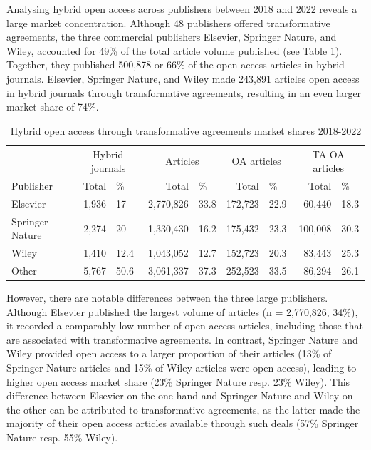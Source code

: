 \documentclass[a4paper,man,floatsintext,longtable,noextraspace,12pt]{apa6}
\begin{document}
Analysing hybrid open access across publishers between 2018 and 2022
reveals a large market concentration. Although 48 publishers offered
transformative agreements, the three commercial publishers Elsevier,
Springer Nature, and Wiley, accounted for 49\% of the total article
volume published (see Table \ref{tab:publisher_league_table}). Together,
they published 500,878 or 66\% of the open access articles in hybrid
journals. Elsevier, Springer Nature, and Wiley made 243,891 articles
open access in hybrid journals through transformative agreements,
resulting in an even larger market share of 74\%.

\begin{table}[H]

\caption{\label{tab:publisher_league_table}Hybrid open access through transformative agreements market shares 2018-2022}
\centering
\begin{tabular}[t]{lrlrlrlrl}
\toprule
\multicolumn{1}{c}{ } & \multicolumn{2}{c}{Hybrid journals} & \multicolumn{2}{c}{Articles} & \multicolumn{2}{c}{OA articles} & \multicolumn{2}{c}{TA OA articles} \\
\cmidrule(l{3pt}r{3pt}){2-3} \cmidrule(l{3pt}r{3pt}){4-5} \cmidrule(l{3pt}r{3pt}){6-7} \cmidrule(l{3pt}r{3pt}){8-9}
Publisher & Total & \% & Total & \% & Total & \% & Total & \%\\
\midrule
Elsevier & 1,936 & 17 & 2,770,826 & 33.8 & 172,723 & 22.9 & 60,440 & 18.3\\
Springer Nature & 2,274 & 20 & 1,330,430 & 16.2 & 175,432 & 23.3 & 100,008 & 30.3\\
Wiley & 1,410 & 12.4 & 1,043,052 & 12.7 & 152,723 & 20.3 & 83,443 & 25.3\\
Other & 5,767 & 50.6 & 3,061,337 & 37.3 & 252,523 & 33.5 & 86,294 & 26.1\\
\bottomrule
\end{tabular}
\end{table}

However, there are notable differences between the three large
publishers. Although Elsevier published the largest volume of articles
(n = 2,770,826, 34\%), it recorded a comparably low number of open
access articles, including those that are associated with transformative
agreements. In contrast, Springer Nature and Wiley provided open access
to a larger proportion of their articles (13\% of Springer Nature
articles and 15\% of Wiley articles were open access), leading to higher
open access market share (23\% Springer Nature resp. 23\% Wiley). This
difference between Elsevier on the one hand and Springer Nature and
Wiley on the other can be attributed to transformative agreements, as
the latter made the majority of their open access articles available
through such deals (57\% Springer Nature resp. 55\% Wiley).
\end{document}
